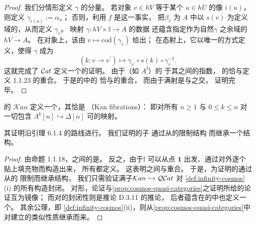 \begin{proof}
我们分情形定义 $\gamma$ 的分量。
若对象 $v\in hV$ 等于某个 $u\in hU$ 的像 $i(u)$，
则定义 $\gamma_{i(u)}:=\alpha_u$；
否则，利用 $f$ 是\trIsofibration{}这一事实，
把\trIsomorphism $\beta_v$ \trLifting{}为 $A$ 中以 $s(v)$ 为定义域的\trIsomorphism{}，从而定义 $\gamma_v$。
映射 $\gamma\colon hV\times\mathbb{I}\to A$ 的数据
还蕴含指定作为自然\trIsomorphism $\gamma$ 之余域的\trFunctor{} $hV\to A$。
在对象上，该\trFunctor{}由 $v\mapsto\mathrm{cod}(\gamma_v)$ 给出；
在态射上，它以唯一的方式定义，使得 $\gamma$ 成为\trNaturalTransformation
\begin{equation*}
(k\colon v\to v^{\prime})\mapsto
\gamma_{v^{\prime}}\circ s(k)\circ\gamma_v^{-1}.
\end{equation*}
这就完成了 $\mathcal{C}at$ 定义一个\trInfinityCosmos{}的证明。
由于\trFunctor{}\trCategory{}（如 $A^{\mathbb{I}}$）的\trNerve
\trIsomorphism{}于其\trNerve{}之间的指数，
\trCategory{}的\trEquivalence{}恰与定义 1.1.23 的\trEquivalence{}重合。 %
于是\trCategory{}的\trInfinityCosmos{}中的\trEquivalence{}%
恰与\trCategory{}的\trEquivalence{}重合，
而由于满射\trEquivalence{}是\trEquivalence{}与\trIsofibration{}之交，
证明完毕。
\end{proof}

\begin{proposition}\label{prop:cosmos-kan-complexes}
\trKanComplex{}的\trCategory{} $\mathcal{K}an$
定义一个\trInfinityCosmos{}，其\trIsofibration{}恰是
\textbf{\trKanFibration}（Kan fibrations）：
即对所有 $n\geq 1$ 与 $0\leq k\leq n$
对一切\trHorn{}包含 $\Lambda^k[n]\hookrightarrow\Delta[n]$ 可\trLifting{}的映射。
\end{proposition}
其证明沿引理 6.1.4 的路线进行。
我们证明\trKanComplex{}的子\trCategory
通过从\trQuasiCategory{}的\trInfinityCosmos{}限制结构
而继承一个\trInfinityCosmos{}结构。
\begin{proof}
由命题 1.1.18，\trKanComplex{}之间的\trIsofibration{}是\trKanFibration{}。 %
反之，由于\trHomotopyCoherentIsomorphism $\mathbb{I}$
可以从点 $\mathbf{1}$ 出发、通过对外\trHorn{}逐个贴上填充物而构造出来，
所有\trKanFibration{}都定义\trIsofibration{}。
这表明\trKanComplex{}之间\trIsofibration{}与\trKanFibration{}重合。
于是，为证明\trKanComplex{}的\trCategory{}通过从\trQuasiCategory{}的%
\trInfinityCosmos{}限制而继承\trInfinityCosmos{}结构，
我们只需验证满子\trCategory $\mathcal{K}an\hookrightarrow\mathcal{Q}\mathcal{C}at$
对 \cref{def:infinity-cosmos}(i) 的所有\trLimit{}构造封闭。
对\trCone{}形\trLimit{}，论证与\cref{prop:cosmos-quasi-categories}之证明所给的论证互为镜像；
而对\trCotensor{}的封闭性则是推论 D.3.11 的推论， %
后者蕴含\trKanComplex{}在\trSimplicialSet{}的\trCategory{}中也定义一个\trExponentialIdeal{}。
其余公理，即 \cref{def:infinity-cosmos}(ii)，则从\cref{prop:cosmos-quasi-categories}中
对\trQuasiCategory{}建立的类似性质继承而来。
\end{proof}

